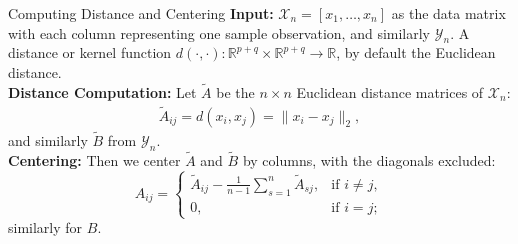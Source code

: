 \documentclass[mathserif,t]{beamer}
\newcommand{\G}{c}
\begin{document}
\begin{frame}{Computing Distance and Centering}
\textbf{Input:} $\mathcal{X}_{n}=[x_{1},\ldots,x_{n}]$ as the data matrix with each column representing one sample observation, and similarly $\mathcal{Y}_{n}$. A distance or kernel function $d(\cdot,\cdot): \mathbb{R}^{p+q} \times \mathbb{R}^{p+q} \rightarrow \mathbb{R}$, by default the Euclidean distance.\\
\pause
\medskip
\textbf{Distance Computation: } Let $\tilde{A}$ be the $n \times n$ Euclidean distance matrices of $\mathcal{X}_{n}$:
\begin{align*}
\tilde{A}_{ij}=d(x_i,x_j)=\|x_{i}-x_{j}\|_{2},
\end{align*}
and similarly $\tilde{B}$ from $\mathcal{Y}_{n}$.\\

\pause
\medskip
\textbf{Centering:} Then we center $\tilde{A}$ and $\tilde{B}$ by columns, with the diagonals excluded:
\begin{equation}
\label{localCoef2}
    A_{ij}=
    \begin{cases}
      \tilde{A}_{ij}-\frac{1}{n-1}\sum_{s=1}^{n} \tilde{A}_{sj}, & \text{if $i \neq j$}, \\    
     0, & \text{if $i=j$};
    \end{cases}
\end{equation}
similarly for $B$. 
\end{frame}

\end{document}
